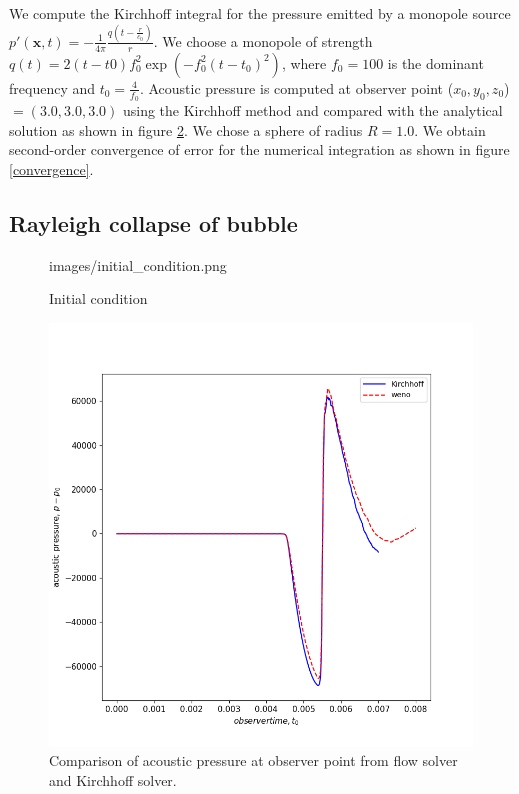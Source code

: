 \documentclass[12pt]{article}
\begin{document}
We compute the Kirchhoff integral for the pressure emitted by a monopole source
$p'(\mathbf{x}, t) = -\frac{1}{4\pi} \frac{  q(t - \frac{r}{c_{0}}) }{r}$. We choose a monopole of strength $q(t) = 2(t - t0)f_{0}^{2}\exp( -f_{0}^2(t - t_{0})^{2})$,
where $f_{0} = 100$ is the dominant frequency and $t_{0} = \frac{4}{f_{0}}$. Acoustic pressure is computed at observer point ($x_{0}, y_{0}, z_{0}$) $= (3.0, 3.0, 3.0)$ using the Kirchhoff method and compared with the analytical solution as shown in figure \ref{comparison}. We chose a sphere of radius $R = 1.0$. We obtain second-order convergence of error for the numerical integration as shown in figure \ref{convergence}.
\subsection{Rayleigh collapse of bubble}
\begin{figure}[h!]
	\centering
	\begin{overpic}[scale=0.5]{images/initial_condition.png}
	\end{overpic}
	\caption{Initial condition}
	\label{Initial condition}
\end{figure}
\begin{figure}[h!]
	\centering
	\includegraphics[scale=0.6]{images/structured_pressure.png}
	\caption{Comparison of acoustic pressure at observer point from flow solver and Kirchhoff solver.}
	\label{comparison}
\end{figure}
\end{document}
